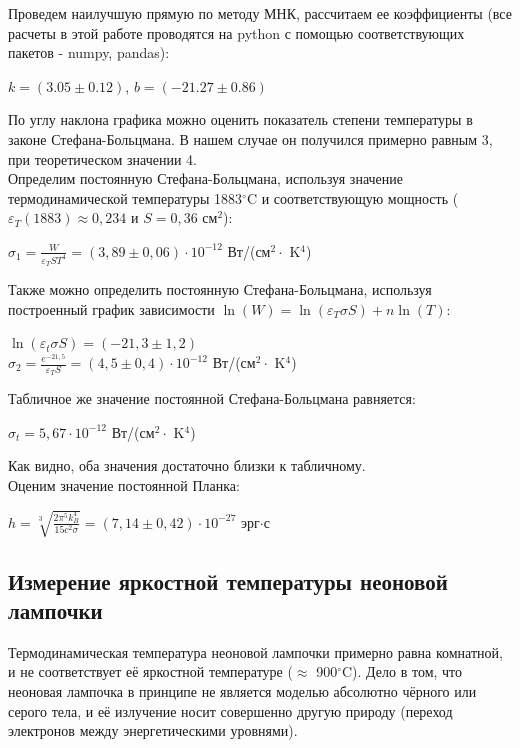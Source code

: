 \documentclass[a4paper,12pt]{extarticle}
\begin{document}
Проведем наилучшую прямую по методу МНК, рассчитаем ее коэффициенты (все расчеты в этой работе проводятся на python с помощью соответствующих пакетов - numpy, pandas):
\begin{center}
    $k = (3.05 \pm 0.12)$, $b = (-21.27 \pm 0.86)$
\end{center}
По углу наклона графика можно оценить показатель степени температуры в законе Стефана-Больцмана. В нашем случае он получился примерно равным 3, при теоретическом значении 4.\\
Определим постоянную Стефана-Больцмана, используя значение термодинамической температуры 1883$^{\circ}$C и соответствующую мощность ($\varepsilon_T(1883) \approx 0,234$ и $S = 0,36$ см$^2$):
\begin{center}
    $\sigma_1 = \frac{W}{\varepsilon_T S T^4} = (3,89 \pm 0,06) \cdot 10^{-12}$ Вт/(см$^2 \cdot$ K$^4$)
\end{center}
Также можно определить постоянную Стефана-Больцмана, используя построенный график зависимости $\ln(W) = \ln(\varepsilon_T \sigma S) + n \ln(T)$:
\begin{center}
    $\ln(\varepsilon_t \sigma S) = (-21,3 \pm 1,2)$ \\
    $\sigma_2 = \frac{e^{-21,5}}{\varepsilon_T S} = (4,5 \pm 0,4) \cdot 10^{-12}$ Вт/(см$^2 \cdot$ K$^4$)
\end{center}
Табличное же значение постоянной Стефана-Больцмана равняется:
\begin{center}
    $\sigma_t = 5,67\cdot 10^{-12}$ Вт/(см$^2 \cdot$ K$^4$)
\end{center}
Как видно, оба значения достаточно близки к табличному.\\
Оценим значение постоянной Планка:
\begin{center}
    $h = \sqrt[3]{\frac{2 \pi^5 k_B^4}{15 c^2 \sigma}} = (7,14 \pm 0,42) \cdot 10^{-27}$ эрг$\cdot$с
\end{center}

\subsection*{Измерение яркостной температуры неоновой лампочки}
Термодинамическая температура неоновой лампочки примерно равна комнатной, и не соответствует её яркостной температуре ($\approx$ 900$^{\circ}$C). Дело в том, что неоновая лампочка в принципе не является моделью абсолютно чёрного или серого тела, и её излучение носит совершенно другую природу (переход электронов между энергетическими уровнями).
\end{document}
